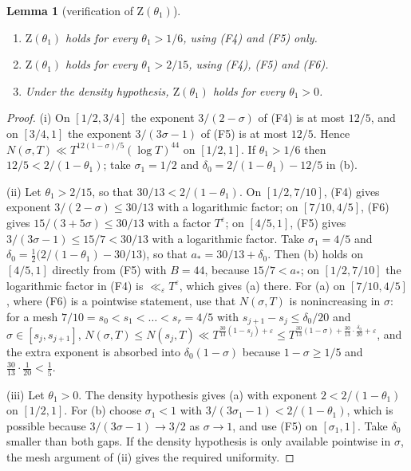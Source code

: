\documentclass[11pt,a4paper]{article}
\newtheorem{lemma}[theorem]{Lemma}
\theoremstyle{definition}
\newcommand{\eps}{\varepsilon}
\begin{document}
\begin{lemma}[verification of $\mathrm Z(\theta_1)$]\label{lem:Z}
\begin{enumerate}[label=\textup{(\roman*)}]
\item $\mathrm Z(\theta_1)$ holds for every $\theta_1>1/6$, using \textup{(F4)} and \textup{(F5)} only.
\item $\mathrm Z(\theta_1)$ holds for every $\theta_1>2/15$, using \textup{(F4)}, \textup{(F5)} and \textup{(F6)}.
\item Under the density hypothesis, $\mathrm Z(\theta_1)$ holds for every $\theta_1>0$.
\end{enumerate}
\end{lemma}

\begin{proof}
(i) On $[1/2,3/4]$ the exponent $3/(2-\sigma)$ of (F4) is at most $12/5$, and on $[3/4,1]$ the exponent
$3/(3\sigma-1)$ of (F5) is at most $12/5$. Hence $N(\sigma,T)\ll T^{12(1-\sigma)/5}(\log T)^{44}$ on $[1/2,1]$.
If $\theta_1>1/6$ then $12/5<2/(1-\theta_1)$; take $\sigma_1=1/2$ and $\delta_0=2/(1-\theta_1)-12/5$ in (b).

(ii) Let $\theta_1>2/15$, so that $30/13<2/(1-\theta_1)$. On $[1/2,7/10]$, (F4) gives exponent
$3/(2-\sigma)\le30/13$ with a logarithmic factor; on $[7/10,4/5]$, (F6) gives $15/(3+5\sigma)\le30/13$ with a
factor $T^\eps$; on $[4/5,1]$, (F5) gives $3/(3\sigma-1)\le 15/7<30/13$ with a logarithmic factor. Take
$\sigma_1=4/5$ and $\delta_0=\tfrac12\bigl(2/(1-\theta_1)-30/13\bigr)$, so that $a_*=30/13+\delta_0$. Then (b) holds on
$[4/5,1]$ directly from (F5) with $B=44$, because $15/7<a_*$; on $[1/2,7/10]$ the logarithmic factor in (F4) is
$\ll_\eps T^\eps$, which gives (a) there. For (a) on $[7/10,4/5]$, where (F6) is a pointwise statement, use that $N(\sigma,T)$ is nonincreasing in
$\sigma$: for a mesh $7/10=s_0<s_1<\dots<s_r=4/5$ with $s_{j+1}-s_j\le\delta_0/20$ and $\sigma\in[s_j,s_{j+1}]$,
$N(\sigma,T)\le N(s_j,T)\ll T^{\frac{30}{13}(1-s_j)+\eps}\le T^{\frac{30}{13}(1-\sigma)+\frac{30}{13}\cdot\frac{\delta_0}{20}+\eps}$, and the extra
exponent is absorbed into $\delta_0(1-\sigma)$ because $1-\sigma\ge1/5$ and $\frac{30}{13}\cdot\frac1{20}<\frac15$.

(iii) Let $\theta_1>0$. The density hypothesis gives (a) with exponent $2<2/(1-\theta_1)$ on $[1/2,1]$. For (b)
choose $\sigma_1<1$ with $3/(3\sigma_1-1)<2/(1-\theta_1)$, which is possible because $3/(3\sigma-1)\to3/2$ as
$\sigma\to1$, and use (F5) on $[\sigma_1,1]$. Take $\delta_0$ smaller than both gaps. If the density hypothesis is
only available pointwise in $\sigma$, the mesh argument of (ii) gives the required uniformity.
\end{proof}
\end{document}
